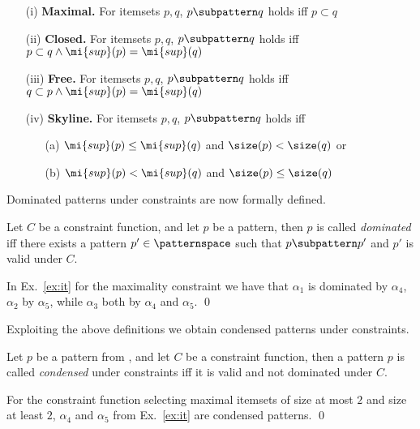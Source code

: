 \begin{itemize}
\item[(i)] \textbf{Maximal.} For itemsets $p,q$, $p \subpattern q$ holds iff $p \subset q$
\item[(ii)] \textbf{Closed.} For itemsets $p,q$, $p \subpattern q$ holds iff $p \subset q \wedge \mi{sup}(p) = \mi{sup}(q)$ 
\item[(iii)] \textbf{Free.} For itemsets $p,q$, $p \subpattern q$ holds iff $q \subset p \wedge \mi{sup}(p) = \mi{sup}(q)$ 
\item[(iv)] \textbf{Skyline.} For itemsets $p,q$, $p \subpattern q$ holds iff 
\begin{itemize}
\item[(a)] $\mi{sup}(p) \leq \mi{sup}(q)$ and $\size(p) < \size(q)$ or 
\item[(b)] $\mi{sup}(p) < \mi{sup}(q) $ and $\size(p) \leq \size(q)$
\end{itemize}
\end{itemize}

Dominated patterns under constraints are now formally defined.

\begin{definition}\label{def:dom}
 Let $C$ be a constraint function, and let $p$ be a pattern, then $p$ is called \emph{dominated} iff there exists a pattern $p' \in \patternspace$ such that $p \subpattern p'$ and $p'$ is valid under $C$.
\end{definition}

\begin{example}
In Ex.~\ref{ex:it} for the maximality constraint we have that $\alpha_1$ is dominated by $\alpha_4$, $\alpha_2$ by $\alpha_5$, while $\alpha_3$ both by $\alpha_4$ and $\alpha_5$. \qed
\end{example}

Exploiting the above definitions we obtain condensed patterns under constraints.

\begin{definition}\label{def:con}
Let $p$ be a pattern from \patternspace, and let $C$ be a constraint function, then a pattern $p$ is called \emph{condensed} under constraints iff it is valid and not dominated under $C$. 
\end{definition}
 \begin{example}
For the constraint function selecting maximal itemsets of size at most $2$ and %
size at least $2$, $\alpha_4$ and $\alpha_5$ from Ex.~\ref{ex:it} are condensed patterns. \qed
 \end{example}

